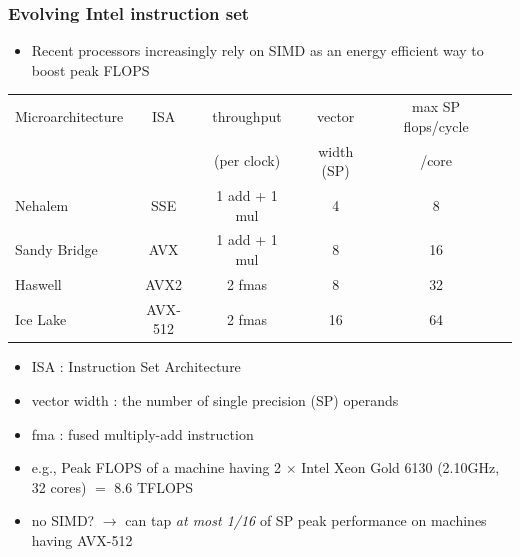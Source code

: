 \documentclass[12pt,dvipdfmx]{beamer}
\newcommand{\ao}[1]{{\color{blue}#1}}
\begin{document}
\begin{frame}
\frametitle{Evolving Intel instruction set}

\begin{itemize}
\item Recent processors increasingly rely on SIMD
  as an energy efficient way to boost peak FLOPS
\end{itemize}

\begin{center}
{\scriptsize
\begin{tabular}{|l|c|c|c|c|c|}\hline
Microarchitecture & ISA    & throughput    & vector   & max SP flops/cycle \\
                  &        & (per clock)   & width (SP) & /core          \\
\hline
Nehalem           & SSE     & 1 add + 1 mul & 4     & 8  \\
Sandy Bridge      & AVX     & 1 add + 1 mul & 8     & 16 \\
Haswell           & AVX2    & 2 fmas        & 8     & 32 \\
\ao{Ice Lake}     & \ao{AVX-512} & \ao{2 fmas}  & \ao{16} & \ao{64} \\
\hline
\end{tabular}
}
\end{center}

\begin{itemize}
\item ISA : Instruction Set Architecture
\item vector width : the number of single precision (SP) operands 
\item fma : fused multiply-add instruction
\item e.g.,
  Peak FLOPS of a machine having 2 $\times$ Intel Xeon Gold 6130 (2.10GHz, 32 cores) $=$ 8.6 TFLOPS
\item no SIMD? $\rightarrow$ can tap {\it at most 1/16} of SP peak performance on machines having AVX-512
\end{itemize}
\end{frame}
\end{document}
